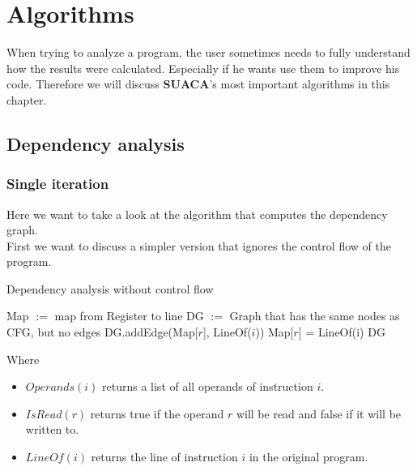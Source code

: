 \documentclass[a4paper,12pt,titlepage, twoside]{report}
\newcommand{\suaca}{\textbf{SUACA}}
\begin{document}

\chapter{Algorithms}
\label{chap:algorithms}

When trying to analyze a program, the user sometimes needs to fully understand how the results were calculated. Especially if he wants use them to improve his code. Therefore we will discuss \suaca's most important algorithms in this chapter.

\section{Dependency analysis}
\label{sec:depanalysis}

\subsection{Single iteration}

Here we want to take a look at the algorithm that computes the dependency graph. \\
First we want to discuss a simpler version that ignores the control flow of the program.

\begin{algorithm}[H]
    \SetAlgoLined
    \caption{Dependency analysis without control flow}
    \label{alg:depsingle}
    Map $:=$ map from Register to line\;
    DG $:=$ Graph that has the same nodes as CFG, but no edges\;
     {
          {
              {
                 DG.addEdge(Map[$r$], LineOf($i$))\;
             }{
                Map[$r$] = LineOf(i)\;
            }
        }
    }
    \Return DG\;
\end{algorithm}

Where
\begin{itemize}
    \item $Operands(i)$ returns a list of all operands of instruction $i$.
    \item $IsRead(r)$ returns true if the operand $r$ will be read and false if it will be written to.
    \item $LineOf(i)$ returns the line of instruction $i$ in the original program.
\end{itemize}
\end{document}
